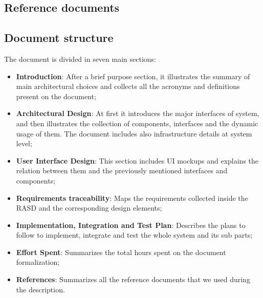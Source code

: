 \subsection{Reference documents}
\subsection{Document structure}
The document is divided in seven main sections:
\begin{itemize}
    \item \textbf{Introduction}: After a brief purpose section, it illustrates the summary of main architectural choices and collects all the acronyms and definitions present on the document;
    \item \textbf{Architectural Design}: At first it introduces the major interfaces of system, and then illustrates the collection of components, interfaces and the dynamic usage of them. The document includes also infrastructure details at system level;
    \item \textbf{User Interface Design}: This section includes UI mockups and explains the relation between them and the previously mentioned interfaces and components;
    \item \textbf{Requirements traceability}: Maps the requirements collected inside the \ac{RASD} and the corresponding design elements;
    \item \textbf{Implementation, Integration and Test Plan}: Describes the plans to follow to implement, integrate and test the whole system and its sub parts;
    \item \textbf{Effort Spent}: Summarizes the total hours spent on the document formalization;
    \item \textbf{References}: Summarizes all the reference documents that we used during the description.
\end{itemize}

\clearpage